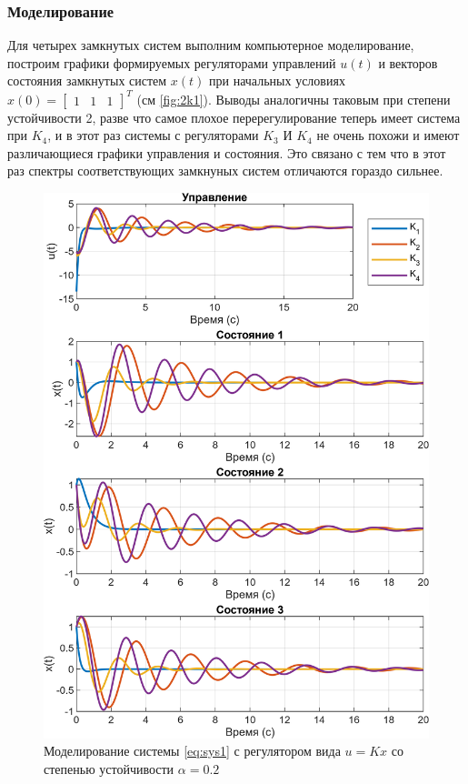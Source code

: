 \subsubsection{Моделирование}

Для четырех замкнутых систем выполним компьютерное моделирование,
построим графики формируемых регуляторами управлений $u(t)$ и векторов
состояния замкнутых систем $x(t)$ при начальных условиях $x(0) =\begin{bmatrix}
    1&1&1
\end{bmatrix}^T$ (см \autoref{fig:2k1}). Выводы аналогичны таковым при степени
устойчивости 2, разве что самое плохое перерегулирование теперь имеет система при
$K_4$, и в этот раз системы с регуляторами $K_3$ И $K_4$
не очень похожи и имеют различающиеся графики управления и состояния. Это 
связано с тем что в этот раз спектры соответствующих замкнуных систем отличаются
гораздо сильнее.

\newpage
\begin{figure}[H]
    \centering
    \includegraphics[width=\linewidth]{figs/task11.png}
    \caption{Моделирование системы \eqref{eq:sys1} с регулятором вида $u=Kx$
    со степенью устойчивости $\alpha=0.2$}
    \label{fig:2k1}
\end{figure}

